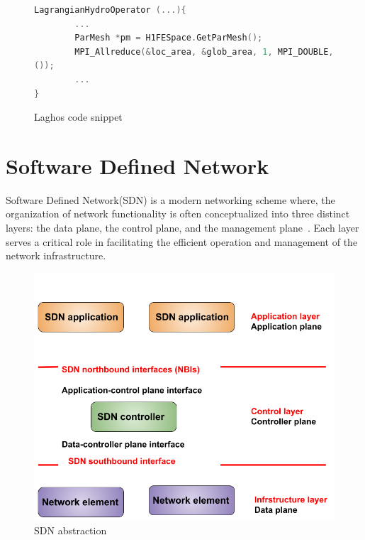 \begin{figure}[H]
\begin{lstlisting}[breaklines, language=C++, frame=single, tabsize=4, basicstyle=\ttfamily]
LagrangianHydroOperator (...){
        ...
        ParMesh *pm = H1FESpace.GetParMesh();
        MPI_Allreduce(&loc_area, &glob_area, 1, MPI_DOUBLE, MPI_SUM, pm->GetComm
());
        ...
}
\end{lstlisting}
\caption{Laghos code snippet}
\label{code.laghos}
\end{figure}

\section{Software Defined Network}
Software Defined Network(SDN) is a modern networking scheme where, the organization of network functionality is often conceptualized into three distinct layers: the data plane, the control plane, and the management plane~\cite{kreutz2014software}. Each layer serves a critical role in facilitating the efficient operation and management of the network infrastructure.

\begin{figure}[h!]
  \centering
  \includegraphics[width=0.8\columnwidth]{figs/sdn_abstraction.png}
  \caption{SDN abstraction }
  \label{fig:sdn_abs}
\end{figure}


